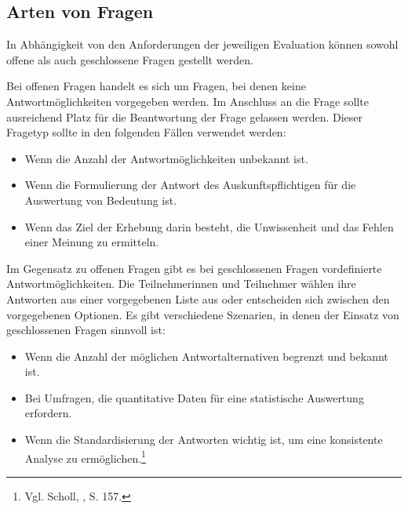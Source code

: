 \subsection{Arten von Fragen}
In Abhängigkeit von den Anforderungen der jeweiligen Evaluation können sowohl offene als auch geschlossene Fragen gestellt werden.

Bei offenen Fragen handelt es sich um Fragen, bei denen keine Antwortmöglichkeiten vorgegeben werden. Im Anschluss an die
Frage sollte ausreichend Platz für die Beantwortung der Frage gelassen werden. Dieser Fragetyp sollte in den folgenden
Fällen verwendet werden:
\begin{itemize}
    \item Wenn die Anzahl der Antwortmöglichkeiten unbekannt ist.
    \item Wenn die Formulierung der Antwort des Auskunftspflichtigen für die Auswertung von Bedeutung ist.
    \item Wenn das Ziel der Erhebung darin besteht, die Unwissenheit und das Fehlen einer Meinung zu ermitteln.\\
\end{itemize}

Im Gegensatz zu offenen Fragen gibt es bei geschlossenen Fragen vordefinierte Antwortmöglichkeiten. Die Teilnehmerinnen
und Teilnehmer wählen ihre Antworten aus einer vorgegebenen Liste aus oder entscheiden sich zwischen den vorgegebenen
Optionen. Es gibt verschiedene Szenarien, in denen der Einsatz von geschlossenen Fragen sinnvoll ist:

\begin{itemize}
    \item Wenn die Anzahl der möglichen Antwortalternativen begrenzt und bekannt ist.
    \item Bei Umfragen, die quantitative Daten für eine statistische Auswertung erfordern.
    \item Wenn die Standardisierung der Antworten wichtig ist, um eine konsistente Analyse zu ermöglichen.\footnote{Vgl. Scholl, \cite{Die Befragung}, S. 157.}\\
\end{itemize}

